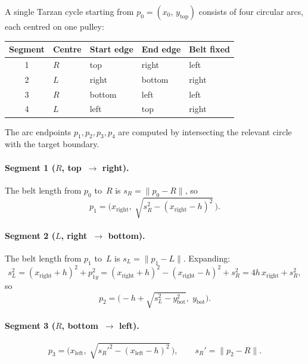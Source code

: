 \documentclass[11pt]{article}
\begin{document}
A single Tarzan cycle starting from $p_0 = (x_0,\, y_{\mathrm{top}})$
consists of four circular arcs, each centred on one pulley:

\begin{center}
\begin{tabular}{cllll}
\toprule
Segment & Centre & Start edge & End edge & Belt fixed \\
\midrule
1 & $R$ & top   & right  & left  \\
2 & $L$ & right & bottom & right \\
3 & $R$ & bottom & left  & left  \\
4 & $L$ & left  & top    & right \\
\bottomrule
\end{tabular}
\end{center}

\noindent
The arc endpoints $p_1, p_2, p_3, p_4$ are computed by intersecting
the relevant circle with the target boundary.

\paragraph{Segment 1 ($R$, top~$\to$ right).}
The belt length from $p_0$ to~$R$ is
$s_R = \lVert p_0 - R \rVert$, so
\begin{equation}
  p_1 = \bigl(x_{\mathrm{right}},\;
              \sqrt{s_R^2 - (x_{\mathrm{right}} - h)^2}\,\bigr).
\end{equation}

\paragraph{Segment 2 ($L$, right~$\to$ bottom).}
The belt length from $p_1$ to~$L$ is $s_L = \lVert p_1 - L \rVert$.
Expanding:
\begin{equation}
  s_L^2
    = (x_{\mathrm{right}} + h)^2 + p_{1y}^2
    = (x_{\mathrm{right}} + h)^2 - (x_{\mathrm{right}} - h)^2
      + s_R^2
    = 4h\,x_{\mathrm{right}} + s_R^2,
\end{equation}
so
\begin{equation}
  p_2 = \bigl(-h + \sqrt{s_L^2 - y_{\mathrm{bot}}^2},\;
              y_{\mathrm{bot}}\bigr).
\end{equation}

\paragraph{Segment 3 ($R$, bottom~$\to$ left).}
\begin{equation}
  p_3 = \bigl(x_{\mathrm{left}},\;
              \sqrt{s_R'^2 - (x_{\mathrm{left}} - h)^2}\,\bigr),
  \qquad
  s_R' = \lVert p_2 - R \rVert.
\end{equation}
\end{document}
